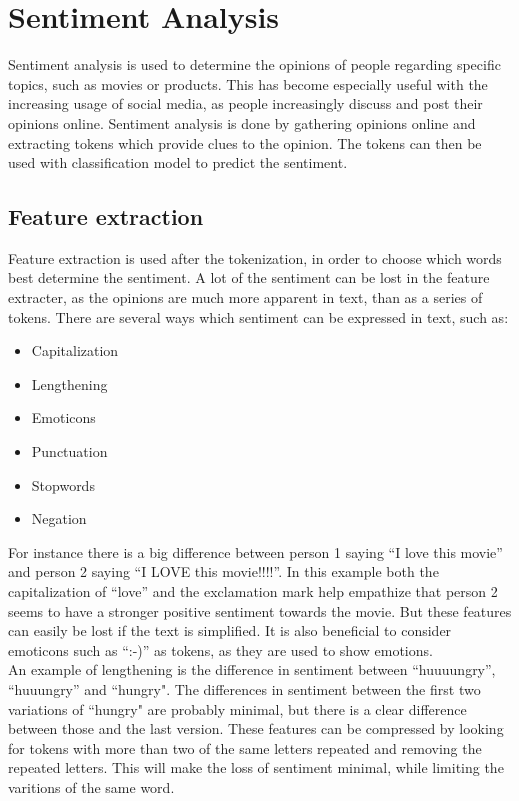 \section{Sentiment Analysis}
Sentiment analysis is used to determine the opinions of people regarding
specific topics, such as movies or products. This has become especially useful
with the increasing usage of social media, as people increasingly discuss and
post their opinions online. Sentiment analysis is done by gathering opinions
online and extracting tokens which provide clues to the opinion. The tokens can
then be used with classification model to predict the sentiment.

\subsection{Feature extraction} 
Feature extraction is used after the tokenization, in order to choose which
words best determine the sentiment. A lot of the sentiment can be lost in the
feature extracter, as the opinions are much more apparent in text, than as a
series of tokens. There are several ways which sentiment can be expressed in
text, such as\citep[Ch.3-4]{Sentiment}:

\begin{itemize}
  \item Capitalization 
  \item Lengthening
  \item Emoticons
  \item Punctuation
  \item Stopwords
  \item Negation
\end{itemize}

For instance there is a big difference between person 1 saying ``I love this
movie'' and person 2 saying ``I LOVE this movie!!!!''. In this example both the
capitalization of ``love'' and the exclamation mark help empathize that person
2 seems to have a stronger positive sentiment towards the movie. But these
features can easily be lost if the text is simplified. It is also beneficial to
consider emoticons such as ``:-)'' as tokens, as they are used to show
emotions.\\

An example of lengthening is the difference in sentiment between ``huuuungry'',
``huuungry'' and ``hungry". The differences in sentiment between the first two
variations of ``hungry" are probably minimal, but there is a clear difference
between those and the last version. These features can be compressed by looking
for tokens with more than two of the same letters repeated and removing the
repeated letters. This will make the loss of sentiment minimal, while limiting
the varitions of the same word.\nl


